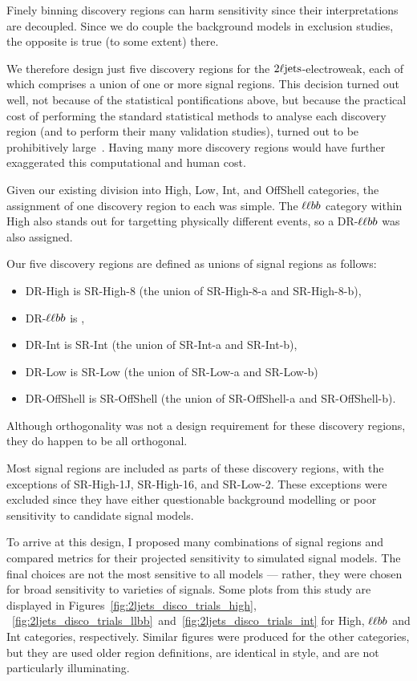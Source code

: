 Finely binning discovery regions can harm sensitivity since their
interpretations are decoupled.
Since we do couple the background models in exclusion studies,
the opposite is true (to some extent) there.

We therefore design just five discovery regions for the
$2\ell\mathrm{jets}$-electroweak, each of which comprises a union of one or more
signal regions.
This decision turned out well, not because of the statistical pontifications
above, but because the practical cost of performing the standard statistical
methods to analyse each discovery region (and to perform their many validation
studies), turned out to be prohibitively large~\cite{verkerke2003roofit}.
Having many more discovery regions would have further exaggerated this
computational and human cost.

Given our existing division into High, Low, Int, and OffShell
categories, the assignment of one discovery region to each was simple.
The $\ell\ell bb$ category within High also stands out for targetting physically
different events, so a DR-$\ell\ell bb$ was also assigned.

Our five discovery regions are defined as unions of signal regions as follows:
\begin{itemize}
\item DR-High is SR-High-8 (the union of SR-High-8-a and SR-High-8-b),
\item DR-$\ell\ell bb$ is \srllbb,
\item DR-Int is SR-Int (the union of SR-Int-a and SR-Int-b),
\item DR-Low is SR-Low (the union of SR-Low-a and SR-Low-b)
\item DR-OffShell is SR-OffShell (the union of SR-OffShell-a and SR-OffShell-b).
\end{itemize}
Although orthogonality was not a design requirement for these discovery
regions, they do happen to be all orthogonal.

Most signal regions are included as parts of these discovery regions, with the
exceptions of SR-High-1J, SR-High-16, and SR-Low-2.
These exceptions were excluded since they have either questionable background
modelling or poor sensitivity to candidate signal models.

To arrive at this design, I proposed many combinations of signal regions and
compared metrics for their projected sensitivity to simulated signal models.
The final choices are not the most sensitive to all models --- rather, they
were chosen for broad sensitivity to varieties of signals.
Some plots from this study are displayed in
Figures~\ref{fig:2ljets_disco_trials_high},
~\ref{fig:2ljets_disco_trials_llbb}~and~\ref{fig:2ljets_disco_trials_int}
for High, $\ell\ell bb$ and Int categories, respectively.
Similar figures were produced for the other categories, but they are used older
region definitions, are identical in style, and are not particularly
illuminating.

